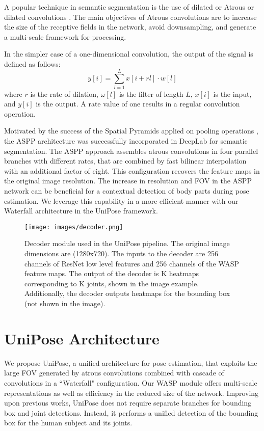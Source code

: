 \documentclass[10pt,twocolumn,letterpaper]{article}
\begin{document}
A popular technique in semantic segmentation is the use of dilated or Atrous or dilated convolutions \cite{DeepLab}. The main objectives of Atrous convolutions are to increase the size of the receptive fields in the network, avoid downsampling, and generate a multi-scale framework for processing. 






In the simpler case of a one-dimensional convolution, the output of the signal is defined as follows:
\begin{equation}
    y[i]=\sum_{l=1}^{L}x[i+rl]\cdot w[l]
\end{equation}
\noindent 
where $r$ is the rate of dilation, $\omega[l]$ is the filter of length $L$, $x[i]$ is the input, and $y[i]$ is the output. A rate value of one results in a regular convolution operation.

Motivated by the success of the Spatial Pyramids applied on pooling operations \cite{SPP}, the ASPP architecture was successfully incorporated in DeepLab \cite{DeepLab} for semantic segmentation.
The ASPP approach assembles atrous convolutions in four parallel branches with different rates, that are combined by fast bilinear interpolation with an additional factor of eight. This configuration recovers the feature maps in the original image resolution.
The increase in resolution and FOV in the ASPP network can be beneficial for a contextual detection of body parts during pose estimation. We leverage this capability in a more efficient manner with our Waterfall architecture in the UniPose framework.

\begin{figure*}[th]
\centering
\texttt{[image: images/decoder.png]}
\caption{Decoder module used in the UniPose pipeline. The original image dimensions are (1280x720). The inputs to the decoder are 256 channels of ResNet low level features and 256 channels of the WASP feature maps. The output of the decoder is K heatmaps corresponding to K joints, shown in the image example. Additionally, the decoder outputs heatmaps for the bounding box (not shown in the image). }
\label{fig:decoder}
\end{figure*}

\section{UniPose Architecture}
We propose UniPose, a unified architecture for pose estimation, that exploits the large FOV generated by atrous convolutions combined with cascade of convolutions in a ``Waterfall" configuration. 
Our WASP module 
offers multi-scale representations as well as efficiency in the reduced size of the network. 
Improving upon previous works,  UniPose does not require separate branches for bounding box and joint detections. 
Instead, it performs a unified detection of the bounding box for the human subject and its joints.
\end{document}
